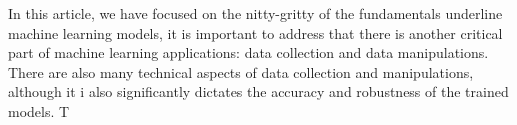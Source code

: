 In this article, we have focused on the nitty-gritty of the fundamentals underline machine learning models, it is important to address that there is another critical part of machine learning applications: data collection and data manipulations. There are also many technical aspects of data collection and manipulations, although it i also significantly dictates the accuracy and robustness of the trained models. T